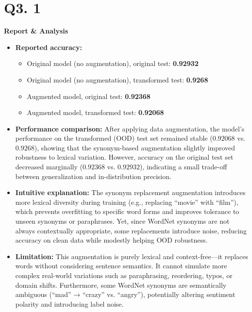 \documentclass{article}
\begin{document}
\section*{Q3. 1}
\textbf{Report \& Analysis}
    \begin{itemize}
        \item \textbf{Reported accuracy:}
        \begin{itemize}
            \item Original model (no augmentation), original test: \textbf{0.92932}
            \item Original model (no augmentation), transformed test: \textbf{0.9268}
            \item Augmented model, original test: \textbf{0.92368}
            \item Augmented model, transformed test: \textbf{0.92068}
        \end{itemize}

        \item \textbf{Performance comparison:}
        After applying data augmentation, the model’s performance on the transformed (OOD) test set remained stable (\(0.92068\) vs. \(0.9268\)), showing that the synonym-based augmentation slightly improved robustness to lexical variation. However, accuracy on the original test set decreased marginally (\(0.92368\) vs. \(0.92932\)), indicating a small trade-off between generalization and in-distribution precision.

        \item \textbf{Intuitive explanation:}
        The synonym replacement augmentation introduces more lexical diversity during training (e.g., replacing “movie” with “film”), which prevents overfitting to specific word forms and improves tolerance to unseen synonyms or paraphrases. Yet, since WordNet synonyms are not always contextually appropriate, some replacements introduce noise, reducing accuracy on clean data while modestly helping OOD robustness.

        \item \textbf{Limitation:}
        This augmentation is purely lexical and context-free—it replaces words without considering sentence semantics. It cannot simulate more complex real-world variations such as paraphrasing, reordering, typos, or domain shifts. Furthermore, some WordNet synonyms are semantically ambiguous (“mad” → “crazy” vs. “angry”), potentially altering sentiment polarity and introducing label noise.
    \end{itemize}
    
\end{document}
